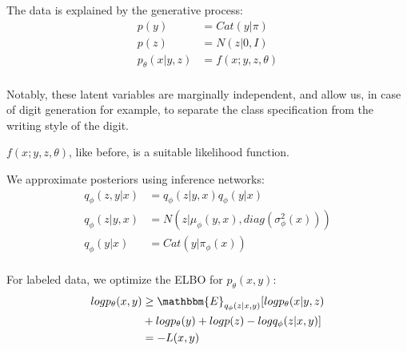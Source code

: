 \documentclass{beamer}
\let\tempone\itemize
\let\temptwo\enditemize
\renewenvironment{itemize}{\tempone\addtolength{\itemsep}{0.5\baselineskip}}{\temptwo}
\newcommand{\E}{\mathbbm{E}}
\begin{document}
\begin{frame}
  \begin{center}
    \begin{itemize}
      \item The data is explained by the generative process:
        \begin{align*}
          p(y) &= Cat(y|\pi)\\
          p(z) &= N(z|0,I)\\
          p_{\theta}(x|y,z) &= f(x;y,z,\theta)\\
        \end{align*}
      \item Notably, these latent variables are marginally independent, and allow us, in case of digit generation for example, to 
      separate the class specification from the writing style of the digit.
      \item $f(x;y,z,\theta)$, like before, is a suitable likelihood function. 
    \end{itemize}
  \end{center}
\end{frame}
\begin{frame}
  \begin{center}
      \begin{itemize}
        \item We approximate posteriors using inference networks:
          \begin{align}
            q_{\phi}(z,y|x) &= q_{\phi}(z|y,x) q_{\phi}(y|x)\\
            q_{\phi}(z|y,x) &= N(z|\mu_{\phi}(y,x), diag(\sigma_{\phi}^2(x)))\\
            q_{\phi}(y|x) &= Cat(y|\pi_{\phi}(x))\\
          \end{align}
        \item For labeled data, we optimize the ELBO for $p_{\theta}(x,y)$:
          \begin{align}
            log p_{\theta}(x,y) &\geq \E_{q_\phi(z|x,y)}[log p_{\theta}(x|y,z)\\
             &+ log p_{\theta}(y) + log p(z) - log q_{\phi}(z|x,y)]\\
              &= -L(x,y)
          \end{align}
     
        \end{itemize}
  \end{center}
\end{frame}
\end{document}
